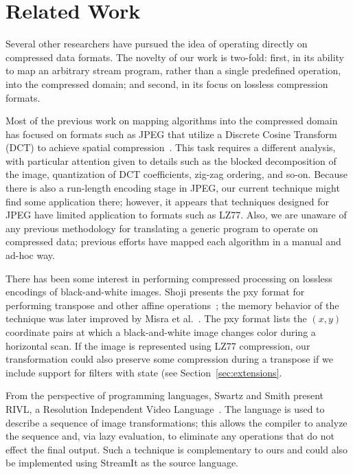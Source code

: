 \section{Related Work}
\label{sec:related}

Several other researchers have pursued the idea of operating directly
on compressed data formats.  The novelty of our work is two-fold:
first, in its ability to map an arbitrary stream program, rather than
a single predefined operation, into the compressed domain; and second,
in its focus on lossless compression formats.

Most of the previous work on mapping algorithms into the compressed
domain has focused on formats such as JPEG that utilize a Discrete
Cosine Transform (DCT) to achieve spatial
compression~\cite{smith98,dorai00,dugad01,feng03,mukherjee02,nang00,shen96,shen96b,shen98,smith96b,vasudev98}.
This task requires a different analysis, with particular attention
given to details such as the blocked decomposition of the image,
quantization of DCT coefficients, zig-zag ordering, and so-on.
Because there is also a run-length encoding stage in JPEG, our current
technique might find some application there; however, it appears that
techniques designed for JPEG have limited application to formats such
as LZ77.  Also, we are unaware of any previous methodology for
translating a generic program to operate on compressed data; previous
efforts have mapped each algorithm in a manual and ad-hoc way.

There has been some interest in performing compressed processing on
lossless encodings of black-and-white images.  Shoji presents the pxy
format for performing transpose and other affine
operations~\cite{shoji95}; the memory behavior of the technique was
later improved by Misra et al.~\cite{misra99}.  
The pxy format lists the $(x,y)$ coordinate pairs at which a
black-and-white image changes color during a horizontal scan.  If the
image is represented using LZ77 compression, our transformation could
also preserve some compression during a transpose if we include
support for filters with state (see Section~\ref{sec:extensions}.

From the perspective of programming languages, Swartz and Smith
present RIVL, a Resolution Independent Video
Language~\cite{swartz95}.  The language is used to describe
a sequence of image transformations; this allows the compiler to
analyze the sequence and, via lazy evaluation, to eliminate any
operations that do not effect the final output.  Such a technique is
complementary to ours and could also be implemented using StreamIt as
the source language.
